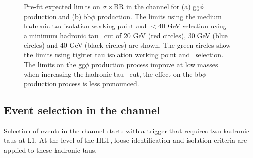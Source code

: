 \begin{figure}[h!]
\begin{center}
\end{center}
\caption{Pre-fit expected limits on $\sigma\times$BR in the \etau channel for (a) gg$\phi$ production and (b) bb$\phi$ production. The
limits using the medium hadronic tau isolation working point and \mT$<40$ GeV selection using a minimum
hadronic tau \pT~cut of 20 GeV (red circles), 30 GeV (blue circles) and 40 GeV (black circles) are shown. The green
circles show the limits using tighter tau isolation working point and \mT~selection. The limits on
the gg$\phi$ production process improve at low masses when increasing the hadronic tau \pT~cut,
the effect on the bb$\phi$ production process is less pronounced.}
\label{fig:mssm_tauptcut_et}
\end{figure}

\subsection{\texorpdfstring{Event selection in the \tautau channel}{Event selection in the tau tau channel}}
\label{sec:mssm_eventsel_tt}
Selection of events in the \tautau channel starts with a trigger
that requires two hadronic taus at \ac{L1}. At the level of the \ac{HLT}, loose identification
and isolation criteria are applied to these hadronic taus.

